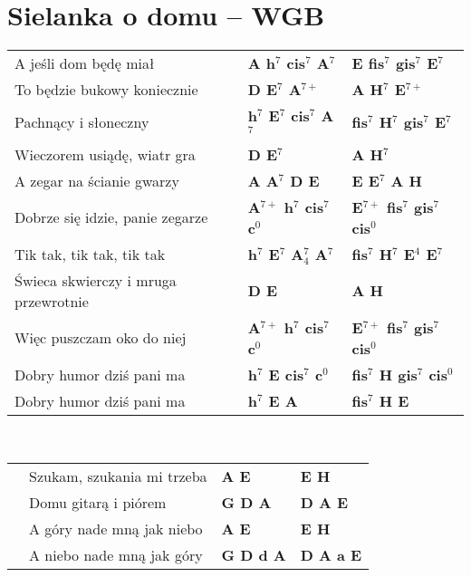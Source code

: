 \section{Sielanka o domu -- WGB}
{\footnotesize\begin{tabular}{@{}p{60mm}@{}p{30mm}|l} 
A jeśli dom będę miał  & {\bfseries A h$^7$ cis$^7$ A$^7$ } & {\bfseries E fis$^7$ gis$^7$ E$^7$}  \\
To będzie bukowy koniecznie & {\bfseries D E$^7$ A$^{7+}$ } & {\bfseries A H$^7$ E$^{7+}$} \\
Pachnący i słoneczny  & {\bfseries h$^7$ E$^7$ cis$^7$ A$^7$ } & {\bfseries fis$^7$ H$^7$ gis$^7$ E$^7$}   \\
Wieczorem usiądę, wiatr gra & {\bfseries D E$^7$ } & {\bfseries A H$^7$}   \\
A zegar na ścianie gwarzy & {\bfseries A A$^7$ D E } & {\bfseries E E$^7$ A H}   \\
Dobrze się idzie, panie zegarze & {\bfseries A$^{7+}$ h$^7$ cis$^7$ c$^0$ } & {\bfseries E$^{7+}$ fis$^7$ gis$^7$ cis$^0$} \\
Tik tak, tik tak, tik tak & {\bfseries h$^7$ E$^7$ A$^{7}_{4}$ A$^7$ } & {\bfseries fis$^7$ H$^7$ E$^4$ E$^7$} \\
Świeca skwierczy i mruga przewrotnie & {\bfseries D E } & {\bfseries A H } \\
Więc puszczam oko do niej & {\bfseries A$^{7+}$ h$^7$ cis$^7$ c$^0$ }  & {\bfseries E$^{7+}$ fis$^7$ gis$^7$ cis$^0$}  \\
Dobry humor dziś pani ma & {\bfseries h$^7$ E cis$^7$ c$^0$ } & {\bfseries fis$^7$ H gis$^7$ cis$^0$}  \\
Dobry humor dziś pani ma & {\bfseries h$^7$ E A} & {\bfseries fis$^7$ H E }   \\
\end{tabular}
\\[1.0mm]
\begin{tabular}{@{}p{5mm}@{}p{55mm}@{}p{30mm}|l} 
& Szukam, szukania mi trzeba & {\bfseries A E } & {\bfseries E H} \\
& Domu gitarą i piórem & {\bfseries G D A }  & {\bfseries D A E } \\
& A góry nade mną jak niebo & {\bfseries A E } & {\bfseries E H } \\
& A niebo nade mną jak góry & {\bfseries G D d A } & {\bfseries D A a E} \\
\end{tabular}
\\[1.0mm]
\begin{tabular}{@{}p{60mm}@{}p{30mm}|l} 

\end{tabular}}
